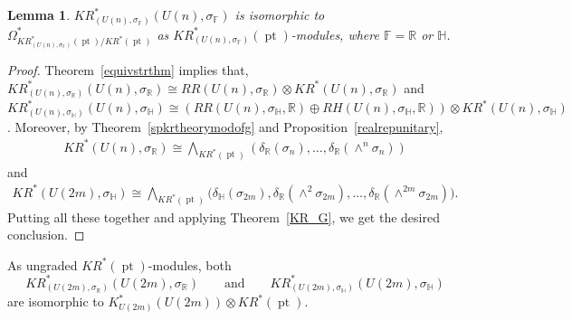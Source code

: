 \documentclass[11pt]{article}
\numberwithin{equation}{section}
\newtheorem{Lemma}[Theorem]{Lemma}
\DeclareMathOperator{\pt}{pt}
\begin{document}
\begin{Lemma}
$KR^*_{(U(n),
\sigma_\mathbb{\mathbb{F}})}\!(U(n){,}
\sigma_\mathbb{F})$ is isomorphic to $\Omega^*_{KR^*_{(U(n),
\sigma_\mathbb{F})}(\pt)/ KR^*(\pt)}\!$ as $KR^*_{(U(n),
\sigma_\mathbb{F})}(\pt)$-modules,
where $\mathbb{F}=\mathbb{R}$ or $\mathbb{H}$.
\end{Lemma}
\begin{proof}
Theorem~\ref{equivstrthm} implies that, $KR^*_{(U(n),
\sigma_\mathbb{R})}(U(n),
\sigma_\mathbb{R})\cong RR(U(n),
\sigma_\mathbb{R})\otimes KR^*(U(n),
\sigma_\mathbb{R})$ and $KR^*_{(U(n),
\sigma_\mathbb{H})}(U(n),
\sigma_\mathbb{H})\cong (RR(U(n),
\sigma_\mathbb{H}, \mathbb{R})\oplus RH(U(n),
\sigma_\mathbb{H}, \mathbb{R}))\otimes KR^*(U(n),
\sigma_\mathbb{H})$.
Moreover, by Theorem~\ref{spkrtheorymodofg} and Proposition~\ref{realrepunitary},
\begin{gather*}
KR^*(U(n),
\sigma_\mathbb{R})\cong \bigwedge\nolimits_{KR^*(\pt)}(\delta_\mathbb{R}(\sigma_n), \dots, \delta_\mathbb{R}
(\wedge^n
\sigma_n))
\end{gather*}
and
\begin{gather*}
KR^*(U(2m),
\sigma_\mathbb{H})\cong\bigwedge\nolimits_{KR^*(\pt)}\big(\delta_\mathbb{H}(\sigma_{2m}), \delta_\mathbb{R}(\wedge^2
\sigma_{2m}), \dots, \delta_\mathbb{R}(\wedge^{2m}\sigma_{2m})\big).
\end{gather*}
Putting all these together and applying Theorem~\ref{KR_G}, we get the desired conclusion.
\end{proof}
\begin{Remark}
\label{ungradediso}
As ungraded $KR^*(\pt)$-modules, both
\[
KR_{(U(2m),
\sigma_\mathbb{R})}^*(U(2m),
\sigma_\mathbb{R}) \qquad \text{and}\qquad KR^*_{(U(2m),
\sigma_\mathbb{H})}(U(2m),
\sigma_\mathbb{H})
\]
 are isomorphic to $K^*_{U(2m)}(U(2m))\otimes KR^*(\pt)$.
\end{Remark}
\end{document}
